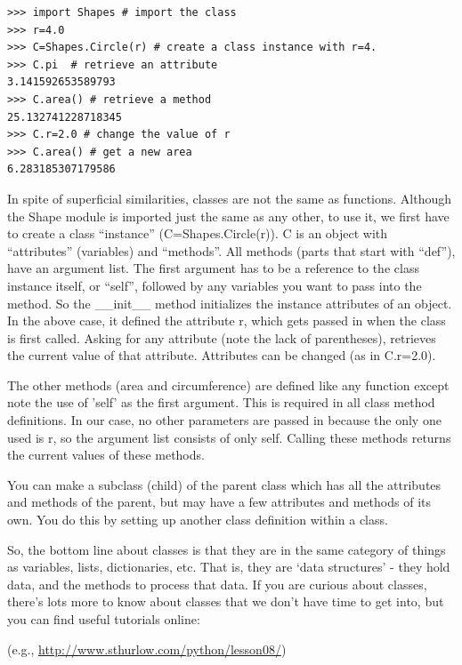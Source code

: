 \documentclass[11pt]{book}
\begin{document}
{{{{ \color{blue} \begin{verbatim}
>>> import Shapes # import the class
>>> r=4.0
>>> C=Shapes.Circle(r) # create a class instance with r=4.
>>> C.pi  # retrieve an attribute
3.141592653589793
>>> C.area() # retrieve a method
25.132741228718345
>>> C.r=2.0 # change the value of r
>>> C.area() # get a new area
6.283185307179586
\end{verbatim}}

\noindent In spite of superficial similarities, classes are not the same as functions.  Although the Shape module is imported just the same as any other, to use it, we first have to create a class ``instance'' ({\color{blue}C=Shapes.Circle(r)}).  {\color{blue}C} is an object with 	``attributes'' (variables) and ``methods''.  
All methods (parts that start with ``def''),  have an argument list. The first argument has to be a reference to the class instance itself, or ``self'', followed by any variables you want to pass into the method.  So the {\color{blue}\_\_init\_\_} method initializes the instance attributes of an object.  In the above case, it defined the attribute {\color{blue}r}, which gets passed in when the class is first called.  
Asking for any attribute (note the lack of parentheses), retrieves the current value of that attribute.  Attributes can be changed (as in  {\color{blue}C.r=2.0}).   

The other methods ({\color{blue}area} and {\color{blue}circumference}) are defined like any function except note the use of 'self' as the first argument.  This is required in all class method definitions.  In our case, no other parameters are passed in because the only one used is {\color{blue}r}, so the argument list consists of only {\color{blue}self}.  Calling these methods returns the current values of these methods.   

You can make a subclass (child) of the parent class which has all the attributes and methods of the parent, but may have a few attributes and methods of its own.   You do this by setting up another class definition within a class.  

So, the bottom line about classes is that they are  in the same category of things as variables, lists, dictionaries, etc. That is, they are  `data structures' - they hold data, and the methods to process that data.
If you are curious about classes, there's lots more to know about classes that we don't have time to get into, but you can find useful tutorials online:

 (e.g., \url{http://www.sthurlow.com/python/lesson08/})
 


}}}
\end{document}
